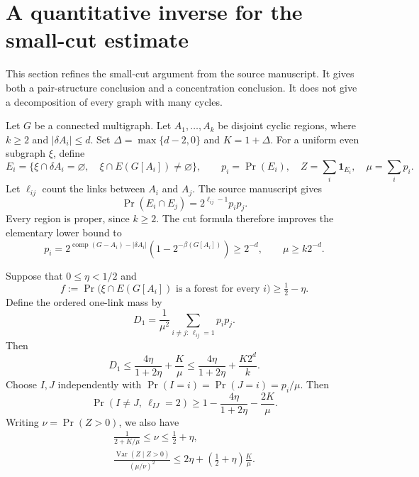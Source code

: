 \section{A quantitative inverse for the small-cut estimate}\label{sec:inverse}

This section refines the small-cut argument from the source manuscript.
It gives both a pair-structure conclusion and a concentration conclusion.
It does not give a decomposition of every graph with many cycles.

Let $G$ be a connected multigraph.
Let $A_1,\ldots,A_k$ be disjoint cyclic regions, where $k\ge2$ and $|\delta A_i|\le d$.
Set $\Delta=\max\{d-2,0\}$ and $K=1+\Delta$.
For a uniform even subgraph $\xi$, define
\[
 E_i=\{\xi\cap\delta A_i=\varnothing,\quad
             \xi\cap E(G[A_i])\ne\varnothing\},\qquad
 p_i=\Pr(E_i),\quad Z=\sum_i\mathbf1_{E_i},\quad \mu=\sum_i p_i.
\]
Let $\ell_{ij}$ count the links between $A_i$ and $A_j$.
The source manuscript gives
\[
 \Pr(E_i\cap E_j)=2^{\ell_{ij}-1}p_i p_j.
\]
Every region is proper, since $k\ge2$.
The cut formula therefore improves the elementary lower bound to
\begin{equation}\label{eq:pi-lower}
 p_i=2^{\operatorname{comp}(G-A_i)-|\delta A_i|}
       (1-2^{-\beta(G[A_i])})\ge2^{-d},\qquad \mu\ge k2^{-d}.
\end{equation}

\begin{theorem}\label{thm:inverse}
Suppose that $0\le\eta<1/2$ and
\[
 f:=\Pr\bigl(\xi\cap E(G[A_i])\text{ is a forest for every }i\bigr)
       \ge\tfrac12-\eta.
\]
Define the ordered one-link mass by
\[
 D_1=\frac1{\mu^2}\sum_{i\ne j:\,\ell_{ij}=1}p_i p_j.
\]
Then
\begin{equation}\label{eq:inverse-mass}
 D_1\le \frac{4\eta}{1+2\eta}+\frac K\mu
       \le \frac{4\eta}{1+2\eta}+\frac{K2^d}{k}.
\end{equation}
Choose $I,J$ independently with $\Pr(I=i)=\Pr(J=i)=p_i/\mu$.
Then
\begin{equation}\label{eq:two-link-mass}
 \Pr(I\ne J,\ \ell_{IJ}=2)
   \ge1-\frac{4\eta}{1+2\eta}-\frac{2K}{\mu}.
\end{equation}
Writing $\nu=\Pr(Z>0)$, we also have
\begin{gather}
 \frac1{2+K/\mu}\le\nu\le\tfrac12+\eta,\label{eq:nu}\\
 \frac{\operatorname{Var}(Z\mid Z>0)}{(\mu/\nu)^2}
       \le2\eta+(\tfrac12+\eta)\frac K\mu.\label{eq:occupancy}
\end{gather}
\end{theorem}

